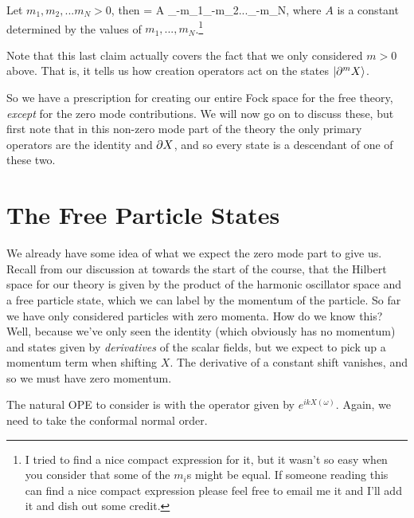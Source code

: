 \bcl 
Let $m_1,m_2,...m_N >0$, then 
\be 
     = A \a_{-m_1}\a_{-m_2}...\a_{-m_N},
\ee 
where $A$ is a constant determined by the values of $m_1,...,m_N$.\footnote{I tried to find a nice compact expression for it, but it wasn't so easy when you consider that some of the $m_i$s might be equal. If someone reading this can find a nice compact expression please feel free to email me it and I'll add it and dish out some credit.}
\ecl 

\br 
Note that this last claim actually covers the fact that we only considered $m>0$ above. That is, it tells us how creation operators act on the states $\ket{\partial^mX}$.
\er 

So we have a prescription for creating our entire Fock space for the free theory, \textit{except} for the zero mode contributions. We will now go on to discuss these, but first note that in this non-zero mode part of the theory the only primary operators are the identity and $\partial X$, and so every state is a descendant of one of these two. 

\section{The Free Particle States}

We already have some idea of what we expect the zero mode part to give us. Recall from our discussion at towards the start of the course, that the Hilbert space for our theory is given by the product of the harmonic oscillator space and a free particle state, which we can label by the momentum of the particle. So far we have only considered particles with zero momenta. How do we know this? Well, because we've only seen the identity (which obviously has no momentum) and states given by \textit{derivatives} of the scalar fields, but we expect to pick up a momentum term when shifting $X$. The derivative of a constant shift vanishes, and so we must have zero momentum. 

The natural OPE to consider is with the operator given by $e^{ikX(\omega)}$. Again, we need to take the conformal normal order. 

